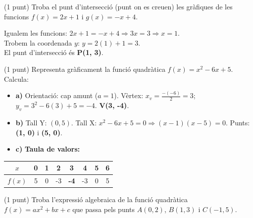 \documentclass[12pt,a4paper]{exam}
\begin{document}
\begin{questions}
\question (1 punt) Troba el punt d'intersecció (punt on es creuen) les gràfiques de les funcions $f(x) = 2x + 1$ i $g(x) = -x + 4$.

\begin{solution}
Igualem les funcions: $2x + 1 = -x + 4 \Rightarrow 3x = 3 \Rightarrow x = 1$. \\
Trobem la coordenada $y$: $y = 2(1) + 1 = 3$. \\
El punt d'intersecció és \textbf{P(1, 3)}.
\end{solution}

\question (1 punt) Representa gràficament la funció quadràtica $f(x) = x^2 - 6x + 5$. Calcula:

\begin{solution}
\begin{itemize}
    \item \textbf{a)} Orientació: cap amunt ($a=1$). Vèrtex: $x_v = \frac{-(-6)}{2} = 3$; $y_v = 3^2 - 6(3) + 5 = -4$. \textbf{V(3, -4)}.
    \item \textbf{b)} Tall Y: $(0, 5)$. Tall X: $x^2 - 6x + 5 = 0 \Rightarrow (x-1)(x-5)=0$. Punts: \textbf{(1, 0)} i \textbf{(5, 0)}.
    \item \textbf{c)} \textbf{Taula de valors:}
\end{itemize}

\begin{center}
\begin{tabular}{|c|c|c|c|c|c|c|c|}
    \hline
    $x$ & 0 & 1 & 2 & \textbf{3} & 4 & 5 & 6 \\ \hline
    $f(x)$ & 5 & 0 & -3 & \textbf{-4} & -3 & 0 & 5 \\ \hline
\end{tabular}
\end{center}
\end{solution}
\question (1 punt) Troba l'expressió algebraica de la funció quadràtica $f(x) = ax^2 + bx + c$ que passa pels punts $A(0, 2)$, $B(1, 3)$ i $C(-1, 5)$.


\end{questions}
\end{document}

